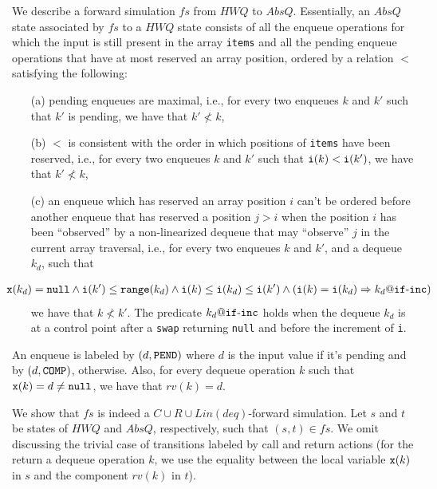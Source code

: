 We describe a forward simulation $\mathit{fs}$ from $\mathit{HWQ}$ to $AbsQ$. Essentially, an $AbsQ$ state associated by $\mathit{fs}$ to a $\mathit{HWQ}$ state consists of all the  enqueue operations for which the input is still present in the array {\tt items} and all the pending enqueue operations that have at most reserved an array position, ordered by a relation $<$ satisfying the following: 
\begin{itemize}
	\item[(a)] pending enqueues are maximal, i.e., for every two enqueues $k$ and $k'$ such that $k'$ is pending, we have that $k'\not< k$,
	\item[(b)] $<$ is consistent with the order in which positions of {\tt items} have been reserved, i.e., for every two enqueues $k$ and $k'$ such that ${\tt i}(k) < {\tt i}(k')$, we have that $k' \not< k$,
	\item[(c)] an enqueue which has reserved an array position $i$ %
	can't be ordered before another enqueue that has reserved a position $j > i$ when the position $i$ has been ``observed'' by a non-linearized dequeue that may ``observe'' $j$ in the current array traversal, i.e., for every two enqueues $k$ and $k'$, and a dequeue $k_d$, such that 
	
	\noindent
	{\small
	\begin{align}
	\hspace{-8mm}
	{\tt x}(k_d)={\tt null} \land {\tt i}(k') \leq {\tt range}(k_d) \land {\tt i}(k) \leq {\tt i}(k_d) \leq {\tt i}(k')
	 \land ({\tt i}(k) = {\tt i}(k_d) => k_d\atCP {\tt if}\text{-}{\tt inc}) \label{eq:inst}
	\end{align}}
	we have that $k \not< k'$. The predicate $k_d\atCP {\tt if}\text{-}{\tt inc}$ holds when the dequeue $k_d$ is at a control point after a {\tt swap} returning {\tt null} and before the increment of {\tt i}.
\end{itemize}

An enqueue is labeled by $(d,{\tt PEND})$ where $d$ is the input value if it's pending and by  $(d,{\tt COMP})$, otherwise. Also, for every dequeue operation $k$ such that ${\tt x}(k)=d\neq {\tt null}$, we have that $rv(k)=d$.

We show that $\mathit{fs}$ is indeed a $C\cup R\cup Lin(deq)$-forward simulation. Let $s$ and $t$ be states of $\mathit{HWQ}$ and $AbsQ$, respectively, such that $(s,t)\in\mathit{fs}$. 
We omit discussing the trivial case of transitions labeled by call and return actions (for the return a dequeue operation $k$, we use the equality between the local variable ${\tt x}(k)$ in $s$ and the component $rv(k)$ in $t$). 

